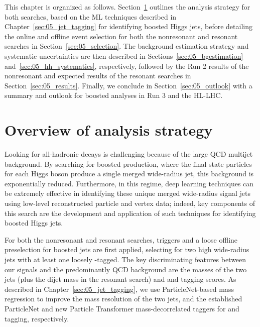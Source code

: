 This chapter is organized as follows.
Section~\ref{sec:05_analysis_strategy} outlines the analysis strategy for both searches, based on the ML techniques described in Chapter~\ref{sec:05_jet_tagging} for identifying boosted Higgs jets, before detailing the online and offline event selection for both the nonresonant and resonant searches in Section~\ref{sec:05_selection}.
The background estimation strategy and systematic uncertainties are then described in Sections~\ref{sec:05_bgestimation} and~\ref{sec:05_hh_systematics}, respectively, followed by the Run 2 results of the nonresonant and expected results of the resonant searches in Section~\ref{sec:05_results}.
Finally, we conclude in Section~\ref{sec:05_outlook} with a summary and outlook for boosted \HH analyses in Run 3 and the HL-LHC.

\section{Overview of analysis strategy}
\label{sec:05_analysis_strategy}

Looking for all-hadronic decays is challenging because of the large QCD multijet background.
By searching for boosted \HHY production, where the final state particles for each Higgs boson produce a single merged wide-radius jet, this background is exponentially reduced.
Furthermore, in this regime, deep learning techniques can be extremely effective in identifying these unique merged wide-radius signal jets using low-level reconstructed particle and vertex data; indeed, key components of this search are the development and application of such techniques for identifying boosted Higgs jets.

For both the nonresonant and resonant searches, triggers and a loose offline preselection for boosted jets are first applied, selecting for two high \pt wide-radius jets with at least one loosely \bbbar-tagged.
The key discriminating features between our signals and the predominantly QCD background are the masses of the two jets (plus the dijet mass in the resonant search) and \bbbar and \VV tagging scores.
As described in Chapter~\ref{sec:05_jet_tagging}, we use ParticleNet-based mass regression to improve the mass resolution of the two jets, and the established ParticleNet and new Particle Transformer mass-decorrelated taggers for \bbbar and \VV tagging, respectively.

